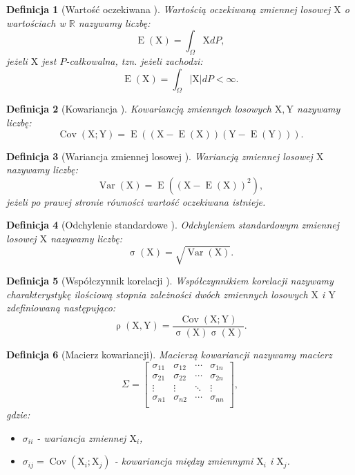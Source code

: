 \documentclass[12pt,a4paper]{report}
\newtheorem{df}{Definicja}[chapter]
\newcommand{\setR}{\mathbb{R}}
\newcommand{\ro}[2]{\operatorname{\rho}\left( {#1},{#2} \right)}
\newcommand{\Covariance}[2]{\operatorname{Cov}\left({#1}; {#2} \right)}
\newcommand{\variance}[1]{\operatorname{Var}\left({#1} \right)}
\newcommand{\e}[1]{\operatorname{E}\left({#1} \right)}
\newcommand{\standard}[1]{\operatorname{\sigma}\left({#1} \right)}
\begin{document}
\begin{df}[Wartość oczekiwana {\citep[Sec 5.6 Def. 2]{jakubowski}}]
Wartością oczekiwaną zmiennej losowej $\mathrm{X}$ o wartościach w $\setR$ nazywamy liczbę:
$$
\e{\mathrm{X}} = \int_{\Omega} \mathrm{X} dP,
$$
jeżeli $\mathrm{X}$ jest $P$-całkowalna, tzn. jeżeli zachodzi:
$$
\e{\mathrm{X}} = \int_{\Omega} |\mathrm{X}| dP < \infty.
$$
\end{df}
\begin{df}[Kowariancja {\citep[Sec 2.8 Def.2.32]{wztp}}]
Kowariancją zmiennych losowych $\mathrm{X},\mathrm{Y}$ nazywamy liczbę:
$$
\Covariance{\mathrm{X}}{\mathrm{Y}} = \e{(\mathrm{X}-\e{\mathrm{X}})(\mathrm{Y}-\e{\mathrm{Y}})}.
$$
\end{df}

\begin{df}[Wariancja zmiennej losowej {\citep[Sec 2.8 Def.2.28]{wztp}}]
Wariancją zmiennej losowej $\mathrm{X}$ nazywamy liczbę:
$$
\variance{\mathrm{X}}=\e{(\mathrm{X}-\e{\mathrm{X}})^2},
$$
jeżeli po prawej stronie równości wartość oczekiwana istnieje.
\end{df} 
\begin{df}[Odchylenie standardowe {\citep[Sec 2.8 Def.2.28]{wztp}}]
Odchyleniem standardowym zmiennej losowej $\mathrm{X}$ nazywamy liczbę:
$$
\standard{\mathrm{X}}=\sqrt{\variance{\mathrm{X}}}.
$$
\end{df}
\begin{df}[Współczynnik korelacji {\citep{wztp}}]
Współczynnikiem korelacji nazywamy charakterystykę ilościową stopnia zależności dwóch zmiennych losowych $\mathrm{X}$ i $\mathrm{Y}$ zdefiniowaną następująco:
$$
\ro{\mathrm{X}}{\mathrm{Y}} = \frac{\Covariance{\mathrm{X}}{\mathrm{Y}}}{\standard{\mathrm{X}} \standard{\mathrm{X}}}.
$$
\end{df}
\begin{df}[Macierz kowariancji]
Macierzą kowariancji nazywamy macierz 
$$
\Sigma= \left[
        \begin{array}{cccc}
         \sigma_{11} & \sigma_{12} & \cdots & \sigma_{1n} \\
         \sigma_{21} & \sigma_{22} & \cdots & \sigma_{2n} \\
         \vdots & \vdots & \ddots & \vdots \\
         \sigma_{n1} & \sigma_{n2} & \cdots & \sigma_{nn}\\
         \end{array}
      \right], 
$$
gdzie:
\begin{itemize}
\item $\sigma_{ii}$ - wariancja zmiennej $\mathrm{X}_i$,
\item $\sigma_{ij}=\Covariance{\mathrm{X}_i}{\mathrm{X}_j}$ - kowariancja między zmiennymi $\mathrm{X}_i$ i $\mathrm{X}_j$.
\end{itemize}
\end{df}
\end{document}
